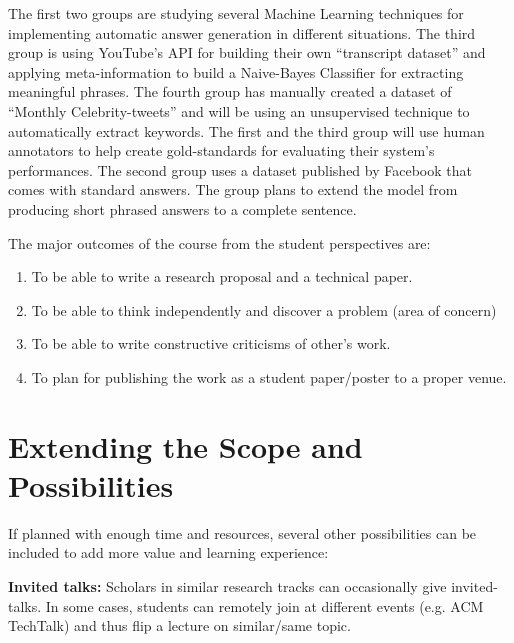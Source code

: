 \documentclass{article}
\begin{document}
\par The first two groups are studying several Machine Learning techniques for implementing automatic answer generation in different situations. The third group is using YouTube's API for building their own ``transcript dataset'' and applying meta-information to build a Naive-Bayes Classifier for extracting meaningful phrases. The fourth group has manually created a dataset of ``Monthly Celebrity-tweets'' and will be using an unsupervised technique to automatically extract keywords. The first and the third group will use human annotators to help create gold-standards for evaluating their system's performances. The second group uses a dataset published by Facebook that comes with standard answers. The group plans to extend the model from producing short phrased answers to a complete sentence. 
\par The major outcomes of the course from the student perspectives are: 
\begin{enumerate}[label=(\alph*), noitemsep, nolistsep]
\item To be able to write a research proposal and a technical paper.
\item To be able to think independently and discover a problem (area of concern) 
\item To be able to write constructive criticisms of other's work.
\item To plan for publishing the work as a student paper/poster to a proper venue.  
\end{enumerate}
\section{Extending the Scope and Possibilities}
\label{extension}
If planned with enough time and resources, several other possibilities can be included to add more value and learning experience:

\par {\bf Invited talks: } Scholars in similar research tracks can occasionally give invited-talks. In some cases, students can remotely join at different events (e.g. ACM TechTalk) and thus flip a lecture on similar/same topic.
\end{document}
